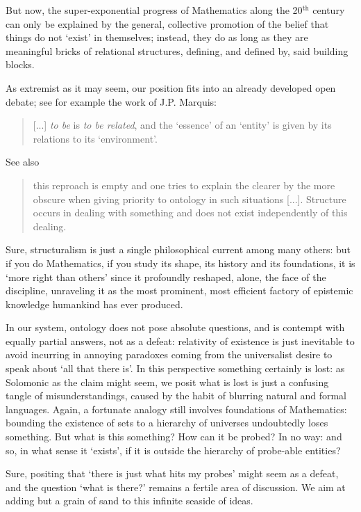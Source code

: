 But now, the super-exponential progress of Mathematics along the 20$^\text{th}$ century can only be explained by the general, collective promotion of the belief that things do not `exist' in themselves; instead, they do as long as they are meaningful bricks of relational structures, defining, and defined by, said building blocks. 

As extremist as it may seem, our position fits into an already developed open debate; see for example the work of J.P. Marquis:
\begin{quote}
    [...] \emph{to be} is \emph{to be related}, and the `essence' of an `entity' is given by its relations to its `environment'.
    \hfill \cite{Marquis1997}
\end{quote}
See also
\begin{quote}
    this reproach is empty and one tries to explain the clearer by the more obscure when giving priority to ontology in such situations [...]. Structure occurs in dealing with something and does not exist independently of this dealing. \cite{kromer2007tool}
\end{quote}
Sure, structuralism is just a single philosophical current among many others: but if you do Mathematics, if you study its shape, its history and its foundations, it is `more right than others' since it profoundly reshaped, alone, the face of the discipline, unraveling it as the most prominent, most efficient factory of epistemic knowledge humankind has ever produced.

In our system, ontology does not pose absolute questions, and is contempt with equally partial answers, not as a defeat: relativity of existence is just inevitable to avoid incurring in annoying paradoxes coming from the universalist desire to speak about `all that there is'. 
In this perspective something certainly is lost: as Solomonic as the claim might seem, we posit what is lost is just a confusing tangle of misunderstandings, caused by the habit of blurring natural and formal languages. Again, a fortunate analogy still involves foundations of Mathematics: bounding the existence of sets to a hierarchy of universes undoubtedly loses something. But what is this something? How can it be probed? In no way: and so, in what sense it `exists', if it is outside the hierarchy of probe-able entities?

Sure, positing that `there is just what hits my probes' might seem as a defeat, and the question `what is there?' remains a fertile area of discussion. We aim at adding but a grain of sand to this infinite seaside of ideas. 

